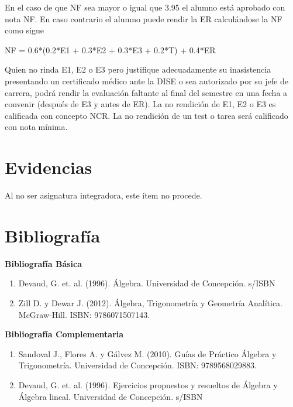 \documentclass[11pt]{article}
\begin{document}
En el caso de que NF sea mayor o igual que 3.95 el alumno está aprobado con nota NF. En caso contrario el alumno puede rendir la ER calculándose la NF como sigue

\begin{center}
NF  = 0.6*(0.2*E1 + 0.3*E2 + 0.3*E3 + 0.2*T) + 0.4*ER
\end{center}

Quien no rinda E1, E2 o E3 pero justifique adecuadamente su inasistencia presentando un certificado médico ante la DISE o sea autorizado por su jefe de carrera, podrá rendir la evaluación faltante al final del semestre en una fecha a convenir (después de E3 y antes de ER). La no rendición de E1, E2 o E3 es calificada con concepto NCR. La no rendición de un test o tarea será calificado con nota mínima.

\section{Evidencias}
\label{sec:orgecb0cab}

Al no ser asignatura integradora, este ítem no procede.

\section{Bibliografía}
\label{sec:orga1a976f}

\textbf{Bibliografía Básica}

\begin{enumerate}
\item Devaud, G. et. al. (1996). Álgebra. Universidad de Concepción. s/ISBN

\item Zill D. y Dewar J. (2012). Álgebra, Trigonometría y Geometría Analítica. McGraw-Hill. ISBN: 9786071507143.
\end{enumerate}

\textbf{Bibliografía Complementaria}

\begin{enumerate}
\item Sandoval J., Flores A. y Gálvez M. (2010). Guías de Práctico Álgebra y Trigonometría. Universidad de Concepción. ISBN: 9789568029883.

\item Devaud, G. et. al. (1996). Ejercicios propuestos y resueltos de Álgebra y Álgebra lineal. Universidad de Concepción. s/ISBN
\end{enumerate}
\end{document}
